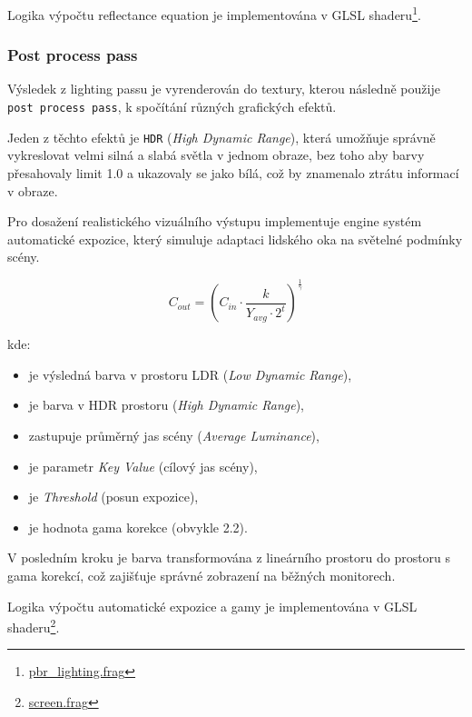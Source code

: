 \documentclass[12pt,a4paper]{article}
\begin{document}
Logika výpočtu reflectance equation je implementována v GLSL shaderu\footnote{\href{https://github.com/Rohlicek128/rainfall_engine/blob/master/engine/src/Rendering/Shaders/GLSL/Lighting/pbr\_lighting.frag}{pbr\_lighting.frag}}.

\subsubsection{Post process pass}
Výsledek z lighting passu je vyrenderován do textury, kterou následně použije \texttt{post process pass}, k spočítání různých grafických efektů.

Jeden z těchto efektů je \texttt{HDR} (\textit{High Dynamic Range}), která umožňuje správně vykreslovat velmi silná a slabá světla v jednom obraze, bez toho aby barvy přesahovaly limit 1.0 a ukazovaly se jako bílá, což by znamenalo ztrátu informací v obraze.

Pro dosažení realistického vizuálního výstupu implementuje engine systém automatické expozice, který simuluje adaptaci lidského oka na světelné podmínky scény.

\begin{equation}
C_{out} = \left( C_{in} \cdot \frac{k}{Y_{avg} \cdot 2^t} \right)^{\frac{1}{\gamma}}
\end{equation}

\noindent kde:
\begin{itemize}
    \item[$C_{out}$] je výsledná barva v prostoru LDR (\textit{Low Dynamic Range}),
    \item[$C_{in}$] je barva v HDR prostoru (\textit{High Dynamic Range}),
    \item[Y] zastupuje průměrný jas scény (\textit{Average Luminance}),
    \item[k] je parametr \textit{Key Value} (cílový jas scény),
    \item[t] je \textit{Threshold} (posun expozice),
    \item[$\gamma$] je hodnota gama korekce (obvykle 2.2).
\end{itemize}

V posledním kroku je barva transformována z lineárního prostoru do prostoru s gama korekcí, což zajišťuje správné zobrazení na běžných monitorech.

Logika výpočtu automatické expozice a gamy je implementována v GLSL shaderu\footnote{\href{https://github.com/Rohlicek128/rainfall_engine/blob/master/engine/src/Rendering/Shaders/GLSL/Screen/screen.frag}{screen.frag}}.
\end{document}
